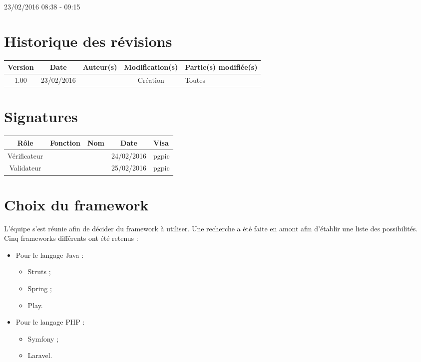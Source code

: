 \documentclass [a4paper] {article}
\begin{document}
23/02/2016			 				%
\hfill   
\hfill 	 08:38 - 09:15 				%



\section*{Historique des révisions}
\begin{center}
			\begin{tabular}{| c | c | c | c | p{4cm} |}
				\hline
				\rowcolor{Gray}
				Version & Date & Auteur(s) & Modification(s) & Partie(s) modifiée(s)		 \\
				\hline
				1.00 & 23/02/2016 & \Pierre & Création & Toutes \\
		\hline		
			\end{tabular}
		\end{center}

\section*{Signatures}

		\begin{center}
			\begin{tabular}{| c | c | c | c | p{4cm} |}
				\hline
				\rowcolor{Gray}
				Rôle & Fonction & Nom & Date & Visa		 \\
				\hline
				Vérificateur & \RQA & \Kafui & 24/02/2016 & pgpic \\[30pt]
				\hline
				Validateur & \CP & \Sergi & 25/02/2016 & pgpic \\[30pt]	
				\hline
			\end{tabular}
		\end{center}
		
\newpage		



\section{Choix du framework}
L'équipe s'est réunie afin de décider du framework à utiliser. Une recherche a été faite en amont afin d'établir une liste des possibilités. Cinq frameworks différents ont été retenus :
\begin{itemize}
\item Pour le langage Java :
	\begin{itemize}
	\item Struts ;
	\item Spring ;
	\item Play.
	\end{itemize}
\item Pour le langage PHP :
	\begin{itemize}
	\item Symfony ;
	\item Laravel.
	\end{itemize}	
\end{itemize}
\end{document}
